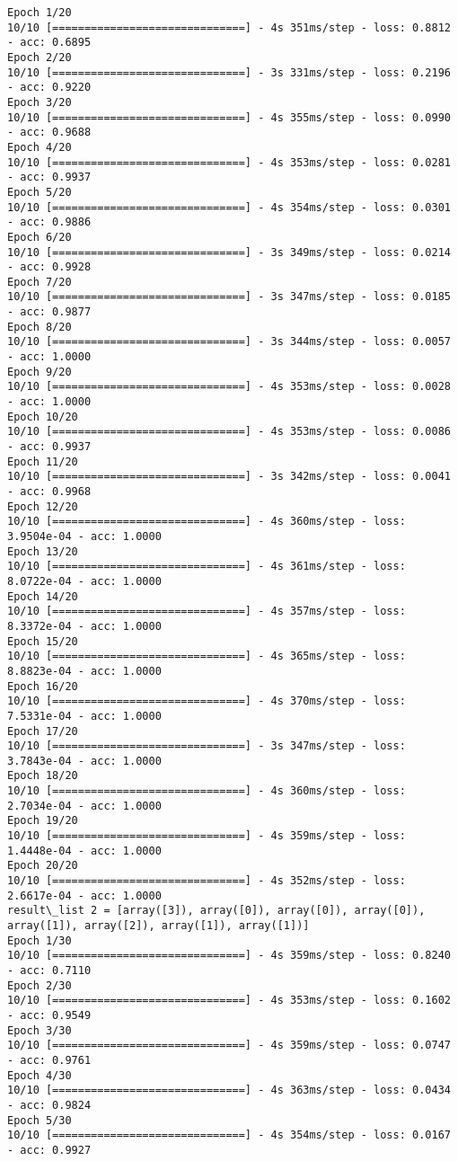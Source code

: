 \documentclass[11pt]{article}
\begin{document}
    \begin{Verbatim}[commandchars=\\\{\}]
Epoch 1/20
10/10 [==============================] - 4s 351ms/step - loss: 0.8812 - acc: 0.6895
Epoch 2/20
10/10 [==============================] - 3s 331ms/step - loss: 0.2196 - acc: 0.9220
Epoch 3/20
10/10 [==============================] - 4s 355ms/step - loss: 0.0990 - acc: 0.9688
Epoch 4/20
10/10 [==============================] - 4s 353ms/step - loss: 0.0281 - acc: 0.9937
Epoch 5/20
10/10 [==============================] - 4s 354ms/step - loss: 0.0301 - acc: 0.9886
Epoch 6/20
10/10 [==============================] - 3s 349ms/step - loss: 0.0214 - acc: 0.9928
Epoch 7/20
10/10 [==============================] - 3s 347ms/step - loss: 0.0185 - acc: 0.9877
Epoch 8/20
10/10 [==============================] - 3s 344ms/step - loss: 0.0057 - acc: 1.0000
Epoch 9/20
10/10 [==============================] - 4s 353ms/step - loss: 0.0028 - acc: 1.0000
Epoch 10/20
10/10 [==============================] - 4s 353ms/step - loss: 0.0086 - acc: 0.9937
Epoch 11/20
10/10 [==============================] - 3s 342ms/step - loss: 0.0041 - acc: 0.9968
Epoch 12/20
10/10 [==============================] - 4s 360ms/step - loss: 3.9504e-04 - acc: 1.0000
Epoch 13/20
10/10 [==============================] - 4s 361ms/step - loss: 8.0722e-04 - acc: 1.0000
Epoch 14/20
10/10 [==============================] - 4s 357ms/step - loss: 8.3372e-04 - acc: 1.0000
Epoch 15/20
10/10 [==============================] - 4s 365ms/step - loss: 8.8823e-04 - acc: 1.0000
Epoch 16/20
10/10 [==============================] - 4s 370ms/step - loss: 7.5331e-04 - acc: 1.0000
Epoch 17/20
10/10 [==============================] - 3s 347ms/step - loss: 3.7843e-04 - acc: 1.0000
Epoch 18/20
10/10 [==============================] - 4s 360ms/step - loss: 2.7034e-04 - acc: 1.0000
Epoch 19/20
10/10 [==============================] - 4s 359ms/step - loss: 1.4448e-04 - acc: 1.0000
Epoch 20/20
10/10 [==============================] - 4s 352ms/step - loss: 2.6617e-04 - acc: 1.0000
result\_list 2 = [array([3]), array([0]), array([0]), array([0]), array([1]), array([2]), array([1]), array([1])]
Epoch 1/30
10/10 [==============================] - 4s 359ms/step - loss: 0.8240 - acc: 0.7110
Epoch 2/30
10/10 [==============================] - 4s 353ms/step - loss: 0.1602 - acc: 0.9549
Epoch 3/30
10/10 [==============================] - 4s 359ms/step - loss: 0.0747 - acc: 0.9761
Epoch 4/30
10/10 [==============================] - 4s 363ms/step - loss: 0.0434 - acc: 0.9824
Epoch 5/30
10/10 [==============================] - 4s 354ms/step - loss: 0.0167 - acc: 0.9927

\end{Verbatim}
\end{document}
